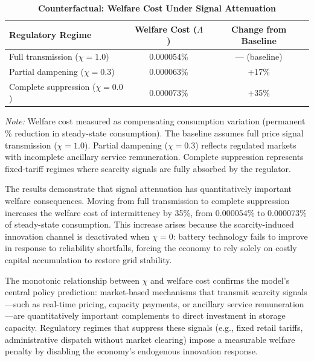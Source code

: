 \documentclass[12pt, a4paper]{article}
\begin{document}
\begin{table}[H]
    \centering
    \caption{\textbf{Counterfactual: Welfare Cost Under Signal Attenuation}}
    \label{tab:counterfactual}
    \renewcommand{\arraystretch}{1.3}
    \begin{tabular}{l c c}
        \toprule
        \textbf{Regulatory Regime} & \textbf{Welfare Cost ($\Lambda$)} & \textbf{Change from Baseline} \\
        \midrule
        Full transmission ($\chi = 1.0$) & 0.000054\% & --- (baseline) \\
        Partial dampening ($\chi = 0.3$) & 0.000063\% & +17\% \\
        Complete suppression ($\chi = 0.0$) & 0.000073\% & +35\% \\
        \bottomrule
    \end{tabular}
    \vspace{0.2cm}
    \parbox{\textwidth}{\footnotesize \textit{Note:} Welfare cost measured as compensating consumption variation (permanent \% reduction in steady-state consumption). The baseline assumes full price signal transmission ($\chi = 1.0$). Partial dampening ($\chi = 0.3$) reflects regulated markets with incomplete ancillary service remuneration. Complete suppression represents fixed-tariff regimes where scarcity signals are fully absorbed by the regulator.}
\end{table}

The results demonstrate that signal attenuation has quantitatively important welfare consequences. Moving from full transmission to complete suppression increases the welfare cost of intermittency by 35\%, from 0.000054\% to 0.000073\% of steady-state consumption. This increase arises because the scarcity-induced innovation channel is deactivated when $\chi = 0$: battery technology fails to improve in response to reliability shortfalls, forcing the economy to rely solely on costly capital accumulation to restore grid stability.

The monotonic relationship between $\chi$ and welfare cost confirms the model's central policy prediction: market-based mechanisms that transmit scarcity signals---such as real-time pricing, capacity payments, or ancillary service remuneration---are quantitatively important complements to direct investment in storage capacity. Regulatory regimes that suppress these signals (e.g., fixed retail tariffs, administrative dispatch without market clearing) impose a measurable welfare penalty by disabling the economy's endogenous innovation response.
\end{document}
